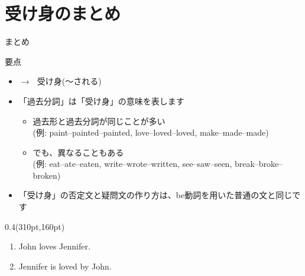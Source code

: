 \documentclass[aspectratio=169,xcolor={dvipsnames,table}]{beamer}
\begin{document}
\section{受け身のまとめ}
\begin{frame}[plain,t]{まとめ}

  \begin{block}{要点}
    \begin{itemize}[square]\small
      \item {} $\longrightarrow$\,\,\,\,受け身(〜される)
      \item 「過去分詞」は「受け身」の意味を表します
            \begin{itemize}
              \item 過去形と過去分詞が同じことが多い\\
                    \mbox{}\hfill{}(例: paint--painted--painted, love--loved--loved, make--made--made)
              \item でも、異なることもある\\
                    \mbox{}\hfill{}(例: eat--ate--eaten, write--wrote--written, see--saw--seen, break--broke--broken)
            \end{itemize}
      \item 「受け身」の否定文と疑問文の作り方は、be動詞を用いた普通の文と同じです
    \end{itemize}
  \end{block}

  \begin{textblock*}{0.4\linewidth}(310pt,160pt)
  \end{textblock*}

\end{frame}
\begin{frame}[plain]
  \large
  \begin{enumerate}
    \item<1-> John loves Jennifer.\hspace{50pt}\hspace{30pt}
    \item<3-> Jennifer is loved by John.\hspace{20pt}\hspace{53pt}
  \end{enumerate}
\end{frame}
\end{document}
